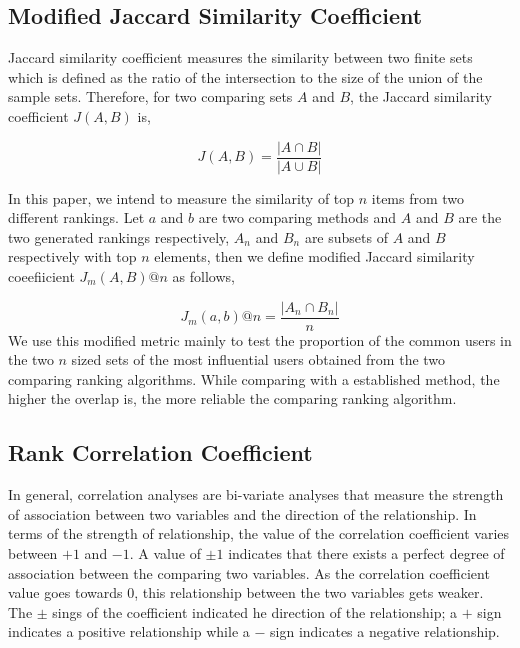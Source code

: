 \documentclass[sigconf]{acmart}
\begin{document}
\subsection{Modified Jaccard Similarity Coefficient}
\label{modified jaccard}
Jaccard similarity coefficient measures the similarity between two finite sets which is defined as the ratio of the intersection to the size of the union of the sample sets. Therefore, for two comparing sets $A$ and $B$, the Jaccard similarity coefficient $J(A,B)$ is,

\begin{equation}
J(A,B) = \dfrac{|A \cap B|}{|A \cup B|}
\end{equation}

In this paper, we intend to measure the similarity of top $n$ items from two different rankings. Let $a$ and $b$ are two comparing methods and $A$ and $B$ are the two generated rankings respectively, $A_n$ and $B_n$ are subsets of $A$ and $B$ respectively with top $n$ elements, then we define modified Jaccard similarity coeefiicient $J_m(A,B)@n$ as follows,

\begin{equation}
J_m(a,b)@n = \dfrac{\vert A_n \cap B_n|}{n}
\label{modified jaccard index}
\end{equation}
We use this modified metric mainly to test the proportion of the common users in the two $n$ sized sets of the most influential users obtained from the two comparing ranking algorithms. While comparing with a established method, the higher the overlap is, the more reliable the comparing ranking algorithm.


\subsection{Rank Correlation Coefficient}

In general, correlation analyses are bi-variate analyses that measure the strength of association between two variables and the direction of the relationship. In terms of the strength of relationship, the value of the correlation coefficient varies between $+1$ and $-1$. A value of $\pm 1$ indicates that there exists a perfect degree of association between the comparing two variables. As the correlation coefficient value goes towards $0$, this relationship between the two variables gets weaker. The $\pm$ sings of the coefficient indicated he direction of the relationship; a $+$ sign indicates a positive relationship while a $-$ sign indicates a negative relationship.
\end{document}

